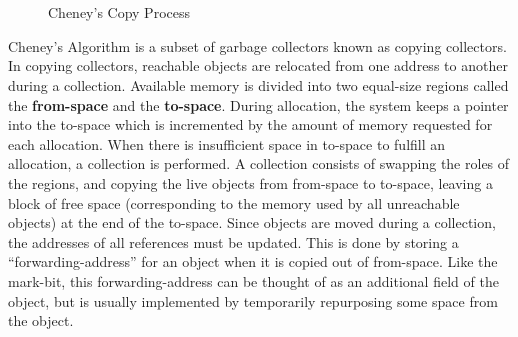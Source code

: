 \documentclass[11pt,leqno]{article}
\newcommand{\mydef}[1]{\textbf{#1}}
\begin{document}
\begin{figure}[H]
\\
      
      \\

	\caption{Cheney's Copy Process}
	\label{fig:cheney}
\end{figure}

Cheney's Algorithm is a subset of garbage collectors known as copying collectors\cite{wiki:garbage_collection}. In copying collectors, reachable objects are relocated from one address to another during a collection. Available memory is divided into two equal-size regions called the \mydef{from-space} and the \mydef{to-space}. During allocation, the system keeps a pointer into the to-space which is incremented by the amount of memory requested for each allocation. When there is insufficient space in to-space to fulfill an allocation, a collection is performed. A collection consists of swapping the roles of the regions, and copying the live objects from from-space to to-space, leaving a block of free space (corresponding to the memory used by all unreachable objects) at the end of the to-space. Since objects are moved during a collection, the addresses of all references must be updated. This is done by storing a “forwarding-address” for an object when it is copied out of from-space. Like the mark-bit, this forwarding-address can be thought of as an additional field of the object, but is usually implemented by temporarily repurposing some space from the object. 
\end{document}
